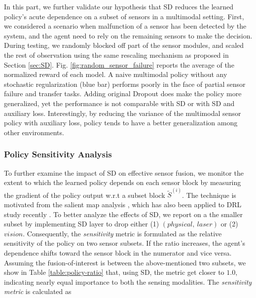 \documentclass[../thesis.tex]{subfiles}
\begin{document}
In this part, we further validate our hypothesis that SD reduces the learned policy's acute dependence on a subset of sensors in a multimodal setting. First, we considered a scenario when malfunction of a sensor has been detected by the system, and the agent need to rely on the remaining sensors to make the decision. During testing, we randomly blocked off part of the sensor modules, and scaled the rest of observation using the same rescaling mechanism as proposed in Section \ref{sec:SD}. Fig. \ref{fig:random_sensor_failure} reports the average of the normalized reward of each model. A naive multimodal policy without any stochastic regularization (blue bar) performs poorly in the face of partial sensor failure and transfer tasks. Adding original Dropout does make the policy more generalized, yet the performance is not comparable with SD or with SD and auxiliary loss. Interestingly, by reducing the variance of the multimodal sensor policy with auxiliary loss, policy tends to have a better generalization among other environments.
 
\subsubsection{Policy Sensitivity Analysis}
To further examine the impact of SD on effective sensor fusion, we monitor the extent to which the learned policy depends on each sensor block by measuring the gradient of the policy output w.r.t a subset block $\tilde{S}^{(i)}$. The technique is motivated from the salient map analysis \cite{simonyan2013deep}, which has also been applied to DRL study recently \cite{WangFL15}.
To better analyze the effects of SD, we report on a the smaller subset by implementing SD layer to drop either (1) $(physical,~ laser)$ or (2) $vision$. Consequently, the \emph{sensitivity} metric is formulated as the relative sensitivity of the policy on two sensor subsets. If the ratio increases, the agent's dependence shifts toward the sensor block in the numerator and vice versa. Assuming the fusion-of-interest is between the above-mentioned two subsets, we show in Table \ref{table:policy-ratio} that, using SD, the metric get closer to $1.0$, indicating nearly equal importance to both the sensing modalities. The \textit{sensitivity metric} is calculated as
 
\end{document}

